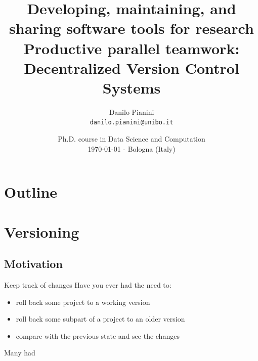 \documentclass[presentation]{beamer}
\title[02 - Teamwork]{\small{Developing, maintaining, and sharing software tools for research} \\
\normalsize{Productive parallel teamwork: Decentralized Version Control Systems}}
\author[D. Pianini]{
Danilo Pianini\\
\texttt{{\footnotesize danilo.pianini@unibo.it}}}
\institute[UniBo]
{\textsc{Alma Mater Studiorum}---Universit\`a di Bologna}
\date[\today{}]{Ph.D. course in Data Science and Computation \\
\scriptsize \today{} - Bologna (Italy)
}
\begin{document}
\newcommand{\codefile}[3]{
	\begin{block}{\texttt{#1}}
		\inputminted[fontsize=#2,linenos=true,breaklines=true]{#3}{#1}
	\end{block}
}

\frame[label=coverpage]{\titlepage}

\section*{Outline}

\frame{\tableofcontents}


\section{Versioning}

\subsection{Motivation}

\begin{frame}{Keep track of changes}
    Have you ever had the need to:
    \begin{itemize}
        \item roll back some project to a working version
        \item roll back some subpart of a project to an older version
        \item compare with the previous state and see the changes
    \end{itemize}
    Many had
\end{frame}
\end{document}
